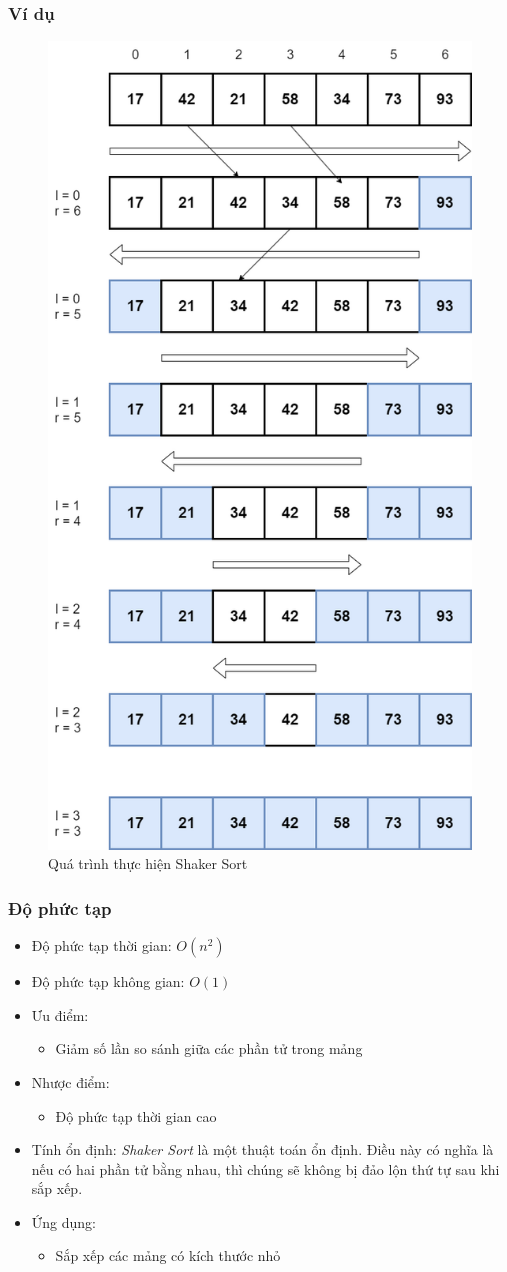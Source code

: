 \subsubsection{Ví dụ}
\begin{figure}[H]
    \centering
    \includegraphics[width=0.6\linewidth]{img/shaker_sort/1.png}
    \caption{Quá trình thực hiện Shaker Sort}
\end{figure}

\subsubsection{Độ phức tạp}

\begin{itemize}
    \item Độ phức tạp thời gian: $O(n^2)$
    \item Độ phức tạp không gian: $O(1)$
    \item Ưu điểm:
        \begin{itemize}
            \item Giảm số lần so sánh giữa các phần tử trong mảng
        \end{itemize}
    \item Nhược điểm:
        \begin{itemize}
            \item Độ phức tạp thời gian cao
        \end{itemize}
    \item Tính ổn định: \textit{Shaker Sort} là một thuật toán ổn định. Điều này có nghĩa là nếu có hai phần tử bằng nhau, thì chúng sẽ không bị đảo lộn thứ tự sau khi sắp xếp.
    \item Ứng dụng:
        \begin{itemize}
            \item Sắp xếp các mảng có kích thước nhỏ
        \end{itemize}
\end{itemize}
